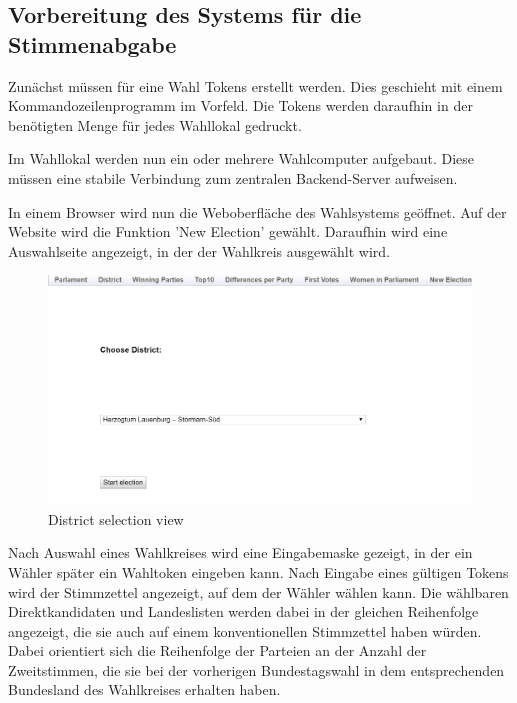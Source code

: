 \documentclass[a4paper]{scrreprt}
\begin{document}
\subsection{Vorbereitung des Systems für die Stimmenabgabe}

Zunächst müssen für eine Wahl Tokens erstellt werden.
Dies geschieht mit einem Kommandozeilenprogramm im Vorfeld.
Die Tokens werden daraufhin in der benötigten Menge für jedes Wahllokal gedruckt.

Im Wahllokal werden nun ein oder mehrere Wahlcomputer aufgebaut.
Diese müssen eine stabile Verbindung zum zentralen Backend-Server aufweisen.

In einem Browser wird nun die Weboberfläche des Wahlsystems geöffnet.
Auf der Website wird die Funktion 'New Election' gewählt.
Daraufhin wird eine Auswahlseite angezeigt, in der der Wahlkreis ausgewählt wird.

\begin{figure}[H]
\centering
\includegraphics[width=\textwidth]{images/select_district.png}
\caption {District selection view}
\end{figure}

Nach Auswahl eines Wahlkreises wird eine Eingabemaske gezeigt, in der ein Wähler später ein Wahltoken eingeben kann. Nach Eingabe eines gültigen Tokens wird der Stimmzettel angezeigt, auf dem der Wähler wählen kann. Die wählbaren Direktkandidaten und Landeslisten werden dabei in der gleichen Reihenfolge angezeigt, die sie auch auf einem konventionellen Stimmzettel haben würden. Dabei orientiert sich die Reihenfolge der Parteien an der Anzahl der Zweitstimmen, die sie bei der vorherigen Bundestagswahl in dem entsprechenden Bundesland des Wahlkreises erhalten haben.
\end{document}
